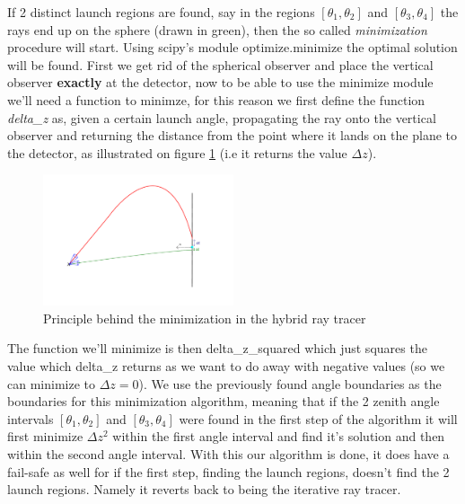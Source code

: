 \documentclass[11pt,a4paper,faculty=we,language=en,doctype=report]{cls/ugent-doc}
\begin{document}
If 2 distinct launch regions are found, say in the regions $[\theta_1,\theta_2]$ and $[\theta_3,\theta_4]$ the
rays end up on the sphere (drawn in green), then the so called \textit{minimization}
procedure will start. Using scipy's module optimize.minimize the optimal
solution will be found. First we get rid of the spherical observer and place
the vertical observer \textbf{exactly} at the detector, now to be able to use the
minimize module we'll need a function to minimze, for this reason we first define the
function \textit{delta\_z} as, given a certain launch angle, propagating the ray
onto the vertical observer and returning the
distance from the point where it lands on the plane to the detector, as
illustrated on figure \ref{fig:PrincipleHybridIllu} (i.e it returns the value $\Delta z$).
\begin{figure}
  \centering
  \includegraphics[width=0.5\textwidth]{PrincipleHybridIllu.pdf}
  \caption{Principle behind the minimization in the hybrid ray tracer}
  \label{fig:PrincipleHybridIllu}
\end{figure}
The function we'll minimize is then delta\_z\_squared which just squares the
value which delta\_z returns as we want to do away with negative values (so we
can minimize to $\Delta z=0$). We use the previously found angle boundaries as
the boundaries for this minimization algorithm, meaning that if the 2 zenith
angle intervals $[\theta_1,\theta_2]$ and $[\theta_3,\theta_4]$ were found in
the first step of the algorithm it will first minimize $\Delta z^2$ within the
first angle interval and find it's solution and then within the second angle
interval. With this our algorithm is done, it does have a fail-safe as well for
if the first step, finding the launch regions, doesn't find the 2 launch
regions.  Namely it reverts back to being the iterative ray tracer.
\end{document}
